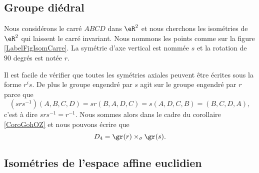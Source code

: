 \subsection{Groupe diédral}

Nous considérons le carré \( ABCD\) dans \( \eR^2\) et nous cherchons les isométries de \( \eR^2\) qui laissent le carré invariant. Nous nommons les points comme sur la figure \ref{LabelFigIsomCarre}. La symétrie d'axe vertical est nommée \( s\) et la rotation de \( 90\) degrés est notée \( r\).
\newcommand{\CaptionFigIsomCarre}{Le carré dont nous étudions le groupe diédral.}


Il est facile de vérifier que toutes les symétries axiales peuvent être écrites sous la forme \( r^is\). De plus le groupe engendré par \( s\) agit sur le groupe engendré par \( r\) parce que
\begin{equation}
    (srs^{-1})(A,B,C,D)=sr(B,A,D,C)=s(A,D,C,B)=(B,C,D,A),
\end{equation}
c'est à dire \( srs^{-1}=r^{-1}\). Nous sommes alors dans le cadre du corollaire \ref{CoroGohOZ} et nous pouvons écrire que
\begin{equation}
    D_4=\gr(r)\times_{\sigma}\gr(s).
\end{equation}

\subsection{Isométries de l'espace affine euclidien}

